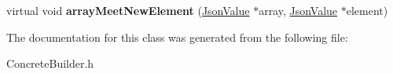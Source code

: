 \begin{DoxyCompactItemize}
\item 
\hypertarget{class_concrete_builder_a0a0c88e4fd092354206209e96ffb9c13}{virtual void {\bfseries array\-Meet\-New\-Element} (\hyperlink{class_json_value}{Json\-Value} $\ast$array, \hyperlink{class_json_value}{Json\-Value} $\ast$element)}\label{class_concrete_builder_a0a0c88e4fd092354206209e96ffb9c13}

\end{DoxyCompactItemize}


The documentation for this class was generated from the following file\-:\begin{DoxyCompactItemize}
\item 
Concrete\-Builder.\-h\end{DoxyCompactItemize}
